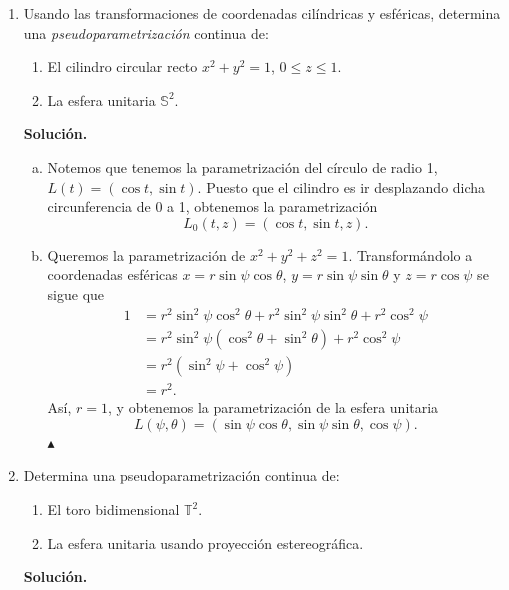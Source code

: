 \documentclass[12pt]{article}
\newcommand{\US}{\mathbb{S}^2}
\begin{document}
\begin{enumerate}
\newpage
\item Usando las transformaciones de coordenadas cil\'indricas y esf\'ericas, determina una \emph{pseudoparametrizaci\'on} continua de: 
\begin{enumerate}[(1)]
\item El cilindro circular recto $x^2+y^2=1$, $0\leq z\leq 1$.
\item La esfera unitaria $\US$.
\end{enumerate}
\textbf{Solución.}
\begin{enumerate}[(a)]
    \item Notemos que tenemos la parametrización del círculo de radio 1, $L(t)=(\cos t,\sin t)$. Puesto que el cilindro es ir desplazando dicha circunferencia de 0 a 1,
        obtenemos la parametrización
        \[
            L_0(t,z)=\left(\cos t,\sin t, z\right).
        \]
    \item Queremos la parametrización de $x^2+y^2+z^2=1$. Transformándolo a coordenadas esféricas $x=r\sin\psi\cos\theta $, $y=r\sin\psi\sin\theta$ y $z=r\cos\psi$ se sigue que
        \begin{align*}
            1 &= r^2\sin^2\psi\cos^2\theta + r^2\sin^2\psi\sin^2\theta + r^2\cos^2\psi \\
            &= r^2\sin^2\psi(\cos^2\theta+\sin^2\theta) + r^2\cos^2\psi \\
            &= r^2(\sin^2\psi + \cos^2\psi) \\
            &= r^2.
        \end{align*}
        Así, $r=1$, y obtenemos la parametrización de la esfera unitaria
        \[
        L(\psi,\theta)=(\sin\psi\cos\theta,\sin\psi\sin\theta,\cos\psi).
        \]
        \hfill $\blacktriangle$
\end{enumerate}

\newpage
\item Determina una pseudoparametrización continua de:
\begin{enumerate}[(1)]
\item El toro bidimensional $\mathbb{T}^2$.
\item La esfera unitaria usando proyección estereográfica.
\end{enumerate}
\textbf{Solución.}
\begin{enumerate}


\end{enumerate}
\end{enumerate}
\end{document}
